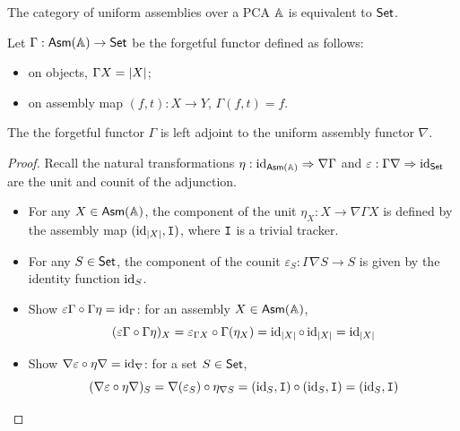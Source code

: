 \begin{corollary}
    The category of uniform assemblies over a PCA \(\mathbb{A}\) is equivalent to \(\mathsf{Set}\).
\end{corollary}

\begin{definition}
    Let \(\Gamma : \mathsf{Asm}(\mathbb{A}) \rightarrow \mathsf{Set}\) be the forgetful functor defined as follows:
    \begin{itemize}
        \item on objects, \(\Gamma X = \vert X \vert\);
        \item on assembly map \((f, t) : X \rightarrow Y\), \(\Gamma(f, t) = f\).
    \end{itemize}
\end{definition}

\begin{proposition}
    The the forgetful functor \(\Gamma\) is left adjoint to the uniform assembly functor \(\nabla\).
\end{proposition}

\begin{proof}
    Recall the natural transformations \(\eta : \operatorname{id}_{\mathsf{Asm}(\mathbb{A})} \Rightarrow \nabla \Gamma\) and \(\varepsilon : \Gamma \nabla \Rightarrow \operatorname{id}_{\mathsf{Set}}\) are the unit and counit of the adjunction.
    \begin{itemize}
        \item For any \(X \in \mathsf{Asm}(\mathbb{A})\), the component of the unit \(\eta_X : X \rightarrow \nabla \Gamma X\) is defined by the assembly map \((\operatorname{id}_{\vert X \vert}, \mathtt{I})\), where \(\mathtt{I}\) is a trivial tracker.
        \item For any \(S \in \mathsf{Set}\), the component of the counit \(\varepsilon_S : \Gamma \nabla S \rightarrow S\) is given by the identity function \(\operatorname{id}_S\).
        \item Show \(\varepsilon \Gamma \circ \Gamma \eta = \operatorname{id}_{\Gamma}\): for an assembly \(X \in \mathsf{Asm}(\mathbb{A})\),
        \[
            (\varepsilon \Gamma \circ \Gamma \eta)_X = \varepsilon_{\Gamma X} \circ \Gamma(\eta_X) = \operatorname{id}_{\vert X \vert} \circ \operatorname{id}_{\vert X \vert} = \operatorname{id}_{\vert X \vert}
        \]
        \item Show \(\nabla \varepsilon \circ \eta \nabla = \operatorname{id}_{\nabla}\): for a set \(S \in \mathsf{Set}\),
        \[
            (\nabla \varepsilon \circ \eta \nabla)_S = \nabla(\varepsilon_S) \circ \eta_{\nabla S} = (\operatorname{id}_S, \mathtt{I}) \circ (\operatorname{id}_S, \mathtt{I}) = (\operatorname{id}_S, \mathtt{I})
        \]
    \end{itemize}
\end{proof}

